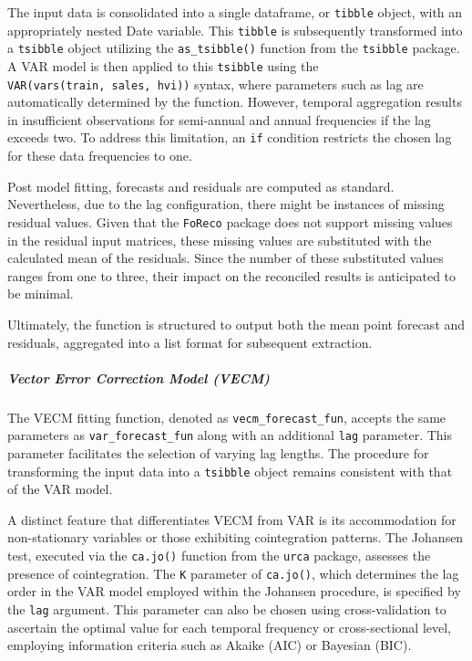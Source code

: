 \documentclass[11pt,a4paper,]{article}
\begin{document}
The input data is consolidated into a single dataframe, or \texttt{tibble} object, with an appropriately nested Date variable. This \texttt{tibble} is subsequently transformed into a \texttt{tsibble} object utilizing the \texttt{as\_tsibble()} function from the \texttt{tsibble} package. A VAR model is then applied to this \texttt{tsibble} using the \texttt{VAR(vars(train,\ sales,\ hvi))} syntax, where parameters such as lag are automatically determined by the function. However, temporal aggregation results in insufficient observations for semi-annual and annual frequencies if the lag exceeds two. To address this limitation, an \texttt{if} condition restricts the chosen lag for these data frequencies to one.

Post model fitting, forecasts and residuals are computed as standard. Nevertheless, due to the lag configuration, there might be instances of missing residual values. Given that the \texttt{FoReco} package does not support missing values in the residual input matrices, these missing values are substituted with the calculated mean of the residuals. Since the number of these substituted values ranges from one to three, their impact on the reconciled results is anticipated to be minimal.

Ultimately, the function is structured to output both the mean point forecast and residuals, aggregated into a list format for subsequent extraction.

\subparagraph{Vector Error Correction Model (VECM)}\label{vector-error-correction-model-vecm}

The VECM fitting function, denoted as \texttt{vecm\_forecast\_fun}, accepts the same parameters as \texttt{var\_forecast\_fun} along with an additional \texttt{lag} parameter. This parameter facilitates the selection of varying lag lengths. The procedure for transforming the input data into a \texttt{tsibble} object remains consistent with that of the VAR model.

A distinct feature that differentiates VECM from VAR is its accommodation for non-stationary variables or those exhibiting cointegration patterns. The Johansen test, executed via the \texttt{ca.jo()} function from the \texttt{urca} package, assesses the presence of cointegration. The \texttt{K} parameter of \texttt{ca.jo()}, which determines the lag order in the VAR model employed within the Johansen procedure, is specified by the \texttt{lag} argument. This parameter can also be chosen using cross-validation to ascertain the optimal value for each temporal frequency or cross-sectional level, employing information criteria such as Akaike (AIC) or Bayesian (BIC).
\end{document}
